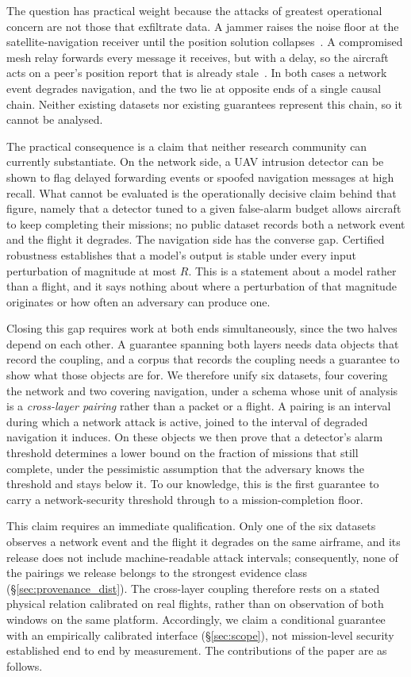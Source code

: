 The question has practical weight because the attacks of greatest operational
concern are not those that exfiltrate data. A jammer raises the noise floor at
the satellite-navigation receiver until the position solution
collapses~\cite{kassas2022jammer}. A compromised mesh relay forwards every
message it receives, but with a delay, so the aircraft acts on a peer's position
report that is already stale~\cite{datamut2026,lou2019timedelay}. In both cases
a network event degrades navigation, and the two lie at opposite ends of a
single causal chain. Neither existing datasets nor existing guarantees represent
this chain, so it cannot be analysed.

The practical consequence is a claim that neither research community can
currently substantiate. On the network side, a UAV intrusion detector can be
shown to flag delayed forwarding events or spoofed navigation messages at high
recall. What cannot be evaluated is the operationally decisive claim behind that
figure, namely that a detector tuned to a given false-alarm budget allows
aircraft to keep completing their missions; no public dataset records both a
network event and the flight it degrades. The navigation side has the converse
gap. Certified robustness establishes that a model's output is stable under
every input perturbation of magnitude at most $R$. This is a statement about a
model rather than a flight, and it says nothing about where a perturbation of
that magnitude originates or how often an adversary can produce one.

Closing this gap requires work at both ends simultaneously, since the two halves
depend on each other. A guarantee spanning both layers needs data objects that
record the coupling, and a corpus that records the coupling needs a guarantee to
show what those objects are for. We therefore unify six datasets, four covering
the network and two covering navigation, under a schema whose unit of analysis
is a \emph{cross-layer pairing} rather than a packet or a flight. A pairing is
an interval during which a network attack is active, joined to the interval of
degraded navigation it induces. On these objects we then prove that a detector's
alarm threshold determines a lower bound on the fraction of missions that still
complete, under the pessimistic assumption that the adversary knows the
threshold and stays below it. To our knowledge, this is the first guarantee to
carry a network-security threshold through to a mission-completion floor.

This claim requires an immediate qualification. Only one of the six datasets
observes a network event and the flight it degrades on the same airframe, and
its release does not include machine-readable attack intervals; consequently,
none of the pairings we release belongs to the strongest evidence class
(\S\ref{sec:provenance_dist}). The cross-layer coupling therefore rests on a
stated physical relation calibrated on real flights, rather than on observation
of both windows on the same platform. Accordingly, we claim a conditional
guarantee with an empirically calibrated interface (\S\ref{sec:scope}), not
mission-level security established end to end by measurement. The contributions
of the paper are as follows.

